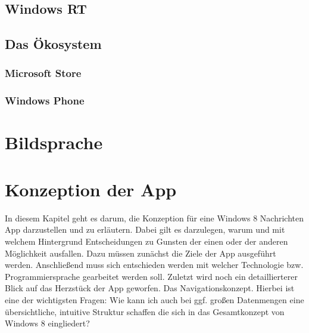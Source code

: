 \documentclass[12pt,a4paper]{scrartcl}
\begin{document}
\subsection{Windows RT}
\label{subsec:winRT}
\subsection{Das Ökosystem}
\label{subsec:ökosystem}
\subsubsection{Microsoft Store}
\label{subsubsec:store}
\subsubsection{Windows Phone}
\label{subsubsec:windowsphone}

\newpage
\section{Bildsprache}

\newpage
\section{Konzeption der App}
\label{sec:konzeption}
In diesem Kapitel geht es darum, die Konzeption für eine Windows 8 Nachrichten App darzustellen und zu erläutern. Dabei gilt es darzulegen, warum und mit welchem Hintergrund Entscheidungen zu Gunsten der einen oder der anderen Möglichkeit ausfallen. Dazu müssen zunächst die Ziele der App ausgeführt werden. Anschließend muss sich entschieden werden mit welcher Technologie bzw. Programmiersprache gearbeitet werden soll. Zuletzt wird noch ein detaillierterer Blick auf das Herzstück der App geworfen. Das Navigationskonzept. Hierbei ist eine der wichtigsten Fragen: \glqq Wie kann ich auch bei ggf. großen Datenmengen eine übersichtliche, intuitive Struktur schaffen die sich in das Gesamtkonzept von Windows 8 eingliedert?\grqq  
\end{document}
